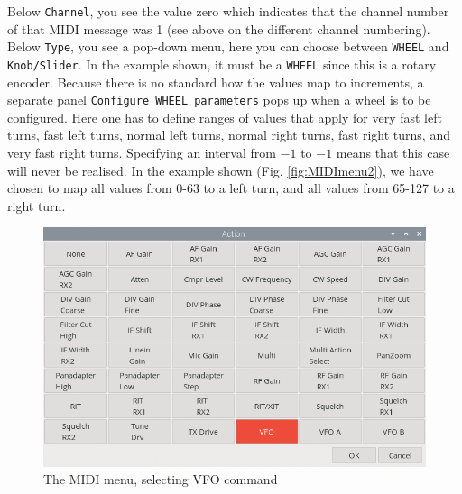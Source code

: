 \documentclass[12pt]{book}
\def\rett#1{\texttt{\color{red}#1}}
\begin{document}
Below \rett{Channel}, you see the value zero which
indicates that the channel number of that MIDI message was 1 (see above on the
different channel numbering). Below \rett{Type}, you see a pop-down menu, here
you can choose between \rett{WHEEL} and \rett{Knob/Slider}. In the example shown,
it must be a \rett{WHEEL} since this is a rotary encoder. Because there is no
standard how the values map to increments, a separate panel
\rett{Configure WHEEL parameters} pops up when a wheel is to be configured.
Here one has to define ranges of values that apply for very fast left turns,
fast left turns, normal left turns, normal right turns, fast right turns,
and very fast right turns. Specifying an interval from $-1$ to $-1$ means that
this case will never be realised. In the example shown (Fig. \ref{fig:MIDImenu2}),
we have chosen to map all values from 0-63 to a left turn, and all values from 65-127
to a right turn.
\begin{figure}[ht!]
\center
\includegraphics[scale=0.45]{MIDImenu3.png}
\caption{The MIDI menu, selecting VFO command}
\label{fig:MIDImenu3}
\end{figure}
\end{document}
